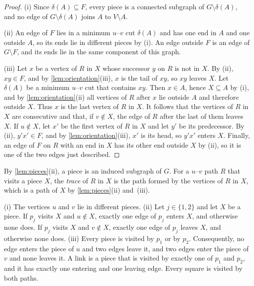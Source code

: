 \begin{proof}
(i) Since $\delta(A) \subseteq F$, every piece is a connected subgraph of $G \setminus \delta(A)$, and no edge of $G \setminus \delta(A)$ joins $A$ to $V \setminus A$.

(ii) An edge of $F$ lies in a minimum $u$--$v$ cut $\delta(A)$ and has one end in $A$ and one outside $A$, so its ends lie in different pieces by (i).
An edge outside $F$ is an edge of $G \setminus F$, and its ends lie in the same component of this graph.

(iii) Let $x$ be a vertex of $R$ in $X$ whose successor $y$ on $R$ is not in $X$.
By (ii), $xy \in F$, and by \cref{lem:orientation}(iii), $x$ is the tail of $xy$, so $xy$ leaves $X$.
Let $\delta(A)$ be a minimum $u$--$v$ cut that contains $xy$.
Then $x \in A$, hence $X \subseteq A$ by (i), and by \cref{lem:orientation}(ii) all vertices of $R$ after $x$ lie outside $A$ and therefore outside $X$.
Thus $x$ is the last vertex of $R$ in $X$.
It follows that the vertices of $R$ in $X$ are consecutive and that, if $v \notin X$, the edge of $R$ after the last of them leaves $X$.
If $u \notin X$, let $x'$ be the first vertex of $R$ in $X$ and let $y'$ be its predecessor.
By (ii), $y'x' \in F$, and by \cref{lem:orientation}(iii), $x'$ is its head, so $y'x'$ enters $X$.
Finally, an edge of $F$ on $R$ with an end in $X$ has its other end outside $X$ by (ii), so it is one of the two edges just described.
\end{proof}

By \cref{lem:pieces}(ii), a piece is an induced subgraph of $G$.
For a $u$--$v$ path $R$ that visits a piece $X$, the \emph{trace} of $R$ in $X$ is the path formed by the vertices of $R$ in $X$, which is a path of $X$ by \cref{lem:pieces}(ii) and~(iii).

\begin{lemma}
\label{lem:degrees}
(i) The vertices $u$ and $v$ lie in different pieces.
(ii) Let $j \in \{1, 2\}$ and let $X$ be a piece.
If $p_j$ visits $X$ and $u \notin X$, exactly one edge of $p_j$ enters $X$, and otherwise none does.
If $p_j$ visits $X$ and $v \notin X$, exactly one edge of $p_j$ leaves $X$, and otherwise none does.
(iii) Every piece is visited by $p_1$ or by $p_2$.
Consequently, no edge enters the piece of $u$ and two edges leave it, and two edges enter the piece of $v$ and none leaves it.
A link is a piece that is visited by exactly one of $p_1$ and $p_2$, and it has exactly one entering and one leaving edge.
Every square is visited by both paths.
\end{lemma}

